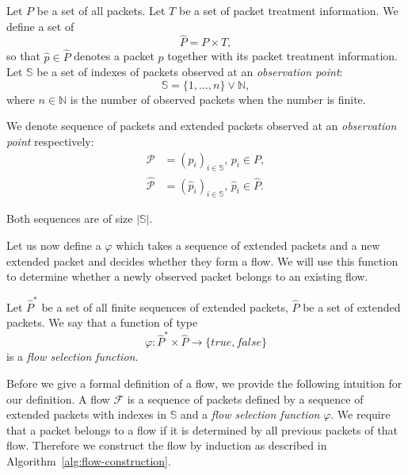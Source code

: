 \begin{defn}
Let $P$ be a set of all packets. Let $T$ be a set of packet treatment information. We define a set of 
\begin{equation*}
    \widehat{P} = P\times T,
\end{equation*}
so that $\widehat{p} \in \widehat{P}$ denotes a packet $p$ together with its packet treatment information. Let $\mathbb{S}$ be a set of indexes of packets observed at an \emph{observation point}:
\begin{equation*}
    \mathbb{S} = \{1, \ldots, n\} \lor \mathbb{N},
\end{equation*}
where $n \in \mathbb{N}$ is the number of observed packets when the number is finite.

We denote sequence of packets and extended packets observed at an \emph{observation point} respectively:
\begin{align*}
    \mathcal{P} &= (p_i)_{i \in \mathbb{S}},\, p_i \in P,\\
    \widehat{\mathcal{P}} &= (\widehat{p}_i)_{i \in \mathbb{S}},\, \widehat{p}_i \in \widehat{P}.
\end{align*}
\end{defn}
Both sequences are of size $|\mathbb{S}|$. 

Let us now define a \emph{} $\varphi$ which takes a sequence of extended packets and a new extended packet and decides whether they form a flow. We will use this function to determine whether a newly observed packet belongs to an existing flow.
\begin{defn}\label{def:flow-selection-function}
Let $\widehat{P}^*$ be a set of all finite sequences of extended packets, $\widehat{P}$ be a set of extended packets. We say that a function of type
\begin{equation*}
    \varphi: \widehat{P}^*\times \widehat{P} \to \{true,false\}
\end{equation*}
is a \emph{flow selection function}.
\end{defn}

Before we give a formal definition of a flow, we provide the following intuition for our definition. A flow $\mathcal{F}$ is a sequence of packets defined by a sequence of extended packets with indexes in $\mathbb{S}$ and a \emph{flow selection function} $\varphi$. We require that a packet belongs to a flow if it is determined by all previous packets of that flow. Therefore we construct the flow by induction as described in Algorithm~\ref{alg:flow-construction}.

